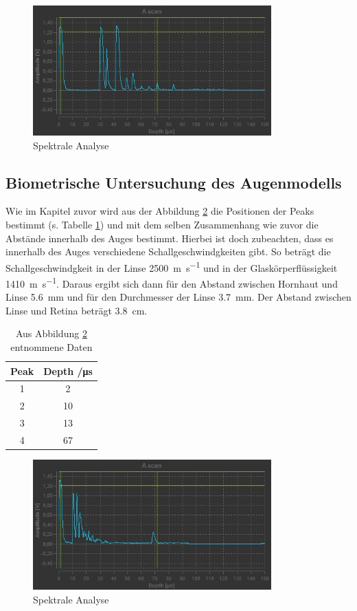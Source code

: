 \begin{figure}
  \centering
  \includegraphics[height = 5cm]{FFS-Data/a_scan_spektrale_analyse.jpg}
  \caption{Spektrale Analyse}
  \label{fig:SA}
\end{figure}
\subsection{Biometrische Untersuchung des Augenmodells}
Wie im Kapitel zuvor wird aus der Abbildung \ref{fig:AU} die Positionen der
Peaks bestimmt (s. Tabelle \ref{tab:AU}) und mit dem selben Zusammenhang wie zuvor die Abstände innerhalb
des Auges bestimmt. Hierbei ist doch zubeachten, dass es innerhalb des Auges
verschiedene Schallgeschwindgkeiten gibt. So beträgt die Schallgeschwindgkeit
in der Linse \SI{2500}{\meter\per\second} und in der Glaskörperflüssigkeit
\SI{1410}{\meter \per \second}.
Daraus ergibt sich dann für den Abstand zwischen Hornhaut und Linse
\SI{5.6}{\milli\meter} und für den Durchmesser der Linse \SI{3.7}{\milli\meter}.
Der Abstand zwischen Linse und Retina beträgt \SI{3.8}{\centi\meter}.

\begin{table}
  \centering
  \caption{Aus Abbildung \ref{fig:AU} entnommene Daten}
  \begin{tabular}{c c}
  \toprule
  Peak & Depth /\si{\micro \second} \\
  \midrule
  1 & 2 \\
  2 & 10 \\
  3 & 13 \\
  4 & 67 \\
  \bottomrule
\end{tabular}
\label{tab:AU}
\end{table}

\begin{figure}
  \centering
  \includegraphics[height = 5cm]{FFS-Data/a_scan_auge.jpg}
  \caption{Spektrale Analyse}
  \label{fig:AU}
\end{figure}
